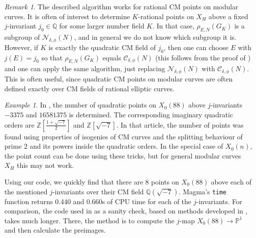 \documentclass[10pt,leqno]{amsart}
\newcommand{\Z}{\mathbb{Z}}
\newcommand{\Q}{\mathbb{Q}}
\newcommand{\PP}{\mathbb{P}}
\theoremstyle{definition}
\theoremstyle{remark}
\newtheorem{example}[theorem]{Example}
\newtheorem{remark}[theorem]{Remark}
\numberwithin{theorem}{section}
\begin{document}
\begin{remark}
The described algorithm works for rational CM points on modular curves. It is often of interest to determine $K$-rational points on $X_H$ above a fixed  $j$-invariant $j_0\in \Q$ for some larger number field $K$. In that case, $\rho_{E,N}(G_K)$ is a subgroup of $\mathcal N_{\delta, \phi}(N)$, and in general we do not know which subgroup it is. However, if $K$ is exactly the quadratic CM field of $j_0$, then one can choose $E$ with  $j(E)=j_0$ so that $\rho_{E,N}(G_K)$ equals $\mathcal C_{\delta, \phi}(N)$ (this follows from the proof of ) and one can apply the same algorithm, just replacing $\mathcal N_{\delta, \phi}(N)$ with $\mathcal C_{\delta, \phi}(N)$. This is often useful, since quadratic CM points on modular curves are often defined exactly over CM fields of rational elliptic curves.
\end{remark}


\begin{example}
    In \cite[Example 4.2]{filip-ja}, the number of quadratic points on $X_0(88)$ above $j$-invariants $-3375$ and $16581375$ is determined.  The corresponding imaginary quadratic orders are $\Z\left[\frac{1+\sqrt{-7}}{2}\right]$ and $\Z[\sqrt {-7}]$. In that article, the number of points was found using properties of isogenies of CM curves and the splitting behaviour of prime $2$ and its powers inside the quadratic orders. In the special case of $X_0(n)$, the point count can be done using these tricks, but for general modular curves $X_H$ this may not work.

    Using our code, we quickly find that there are $8$ points on $X_0(88)$ above each of the mentioned $j$-invariants over their CM field $\Q(\sqrt{-7})$. Magma's \texttt{time} function returns 0.440 and 0.660s of CPU time for each of the $j$-invariants. For comparison, the code used in \cite{filip-ja} as a sanity check, based on methods developed in \cite{nikola}, takes much longer. There, the method is to compute the $j$-map $X_0(88)\to \PP^1$ and then calculate the preimages.  
\end{example}





\end{document}
